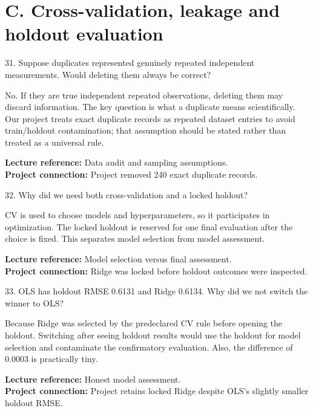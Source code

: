 \documentclass[10.5pt,a4paper]{article}
\newcommand{\chapref}[1]{\textbf{Lecture reference:} #1}
\newcommand{\projectref}[1]{\textbf{Project connection:} #1}
\begin{document}
\section*{C. Cross-validation, leakage and holdout evaluation}
\begin{qbox}{31. Suppose duplicates represented genuinely repeated independent measurements. Would deleting them always be correct?}
\end{qbox}
\begin{answerbox}No. If they are true independent repeated observations, deleting them may discard information. The key question is what a duplicate means scientifically. Our project treats exact duplicate records as repeated dataset entries to avoid train/holdout contamination; that assumption should be stated rather than treated as a universal rule.\end{answerbox}
\begin{refbox}\chapref{Data audit and sampling assumptions.}\\\projectref{Project removed 240 exact duplicate records.}\end{refbox}
\begin{qbox}{32. Why did we need both cross-validation and a locked holdout?}
\end{qbox}
\begin{answerbox}CV is used to choose models and hyperparameters, so it participates in optimization. The locked holdout is reserved for one final evaluation after the choice is fixed. This separates model selection from model assessment.\end{answerbox}
\begin{refbox}\chapref{Model selection versus final assessment.}\\\projectref{Ridge was locked before holdout outcomes were inspected.}\end{refbox}
\begin{qbox}{33. OLS has holdout RMSE 0.6131 and Ridge 0.6134. Why did we not switch the winner to OLS?}
\end{qbox}
\begin{answerbox}Because Ridge was selected by the predeclared CV rule before opening the holdout. Switching after seeing holdout results would use the holdout for model selection and contaminate the confirmatory evaluation. Also, the difference of 0.0003 is practically tiny.\end{answerbox}
\begin{refbox}\chapref{Honest model assessment.}\\\projectref{Project retains locked Ridge despite OLS's slightly smaller holdout RMSE.}\end{refbox}
\end{document}
